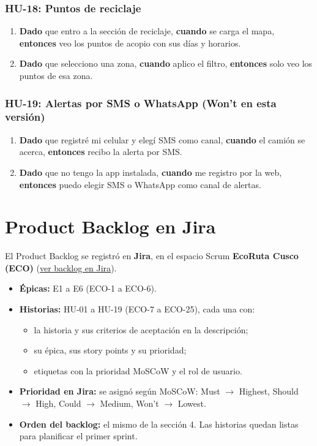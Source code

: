 \documentclass[11pt,a4paper]{article}
\newcommand{\dce}[3]{\textbf{Dado} #1, \textbf{cuando} #2, \textbf{entonces} #3}
\newcommand{\criterios}[1]{\subsubsection*{#1}}
\begin{document}
\criterios{HU-18: Puntos de reciclaje}
\begin{enumerate}
  \item \dce{que entro a la sección de reciclaje}{se carga el mapa}{veo los puntos de acopio con sus días y horarios.}
  \item \dce{que selecciono una zona}{aplico el filtro}{solo veo los puntos de esa zona.}
\end{enumerate}

\criterios{HU-19: Alertas por SMS o WhatsApp (Won't en esta versión)}
\begin{enumerate}
  \item \dce{que registré mi celular y elegí SMS como canal}{el camión se acerca}{recibo la alerta por SMS.}
  \item \dce{que no tengo la app instalada}{me registro por la web}{puedo elegir SMS o WhatsApp como canal de alertas.}
\end{enumerate}

\section{Product Backlog en Jira}

El Product Backlog se registró en \textbf{Jira}, en el espacio Scrum \textbf{EcoRuta Cusco (ECO)}
(\href{https://ing-software1-residuos.atlassian.net/jira/software/projects/ECO/boards/2/backlog}{\textcolor{verde}{ver backlog en Jira}}).

\begin{itemize}
  \item \textbf{Épicas:} E1 a E6 (ECO-1 a ECO-6).
  \item \textbf{Historias:} HU-01 a HU-19 (ECO-7 a ECO-25), cada una con:
  \begin{itemize}
    \item la historia y sus criterios de aceptación en la descripción;
    \item su épica, sus story points y su prioridad;
    \item etiquetas con la prioridad MoSCoW y el rol de usuario.
  \end{itemize}
  \item \textbf{Prioridad en Jira:} se asignó según MoSCoW: Must $\rightarrow$ Highest, Should $\rightarrow$ High, Could $\rightarrow$ Medium, Won't $\rightarrow$ Lowest.
  \item \textbf{Orden del backlog:} el mismo de la sección 4. Las historias quedan listas para planificar el primer sprint.
\end{itemize}
\end{document}
